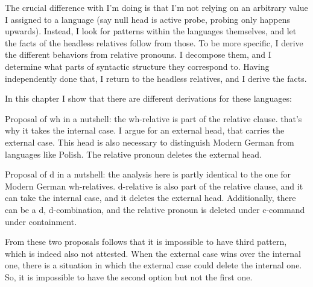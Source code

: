 The crucial difference with I'm doing is that I'm not relying on an arbitrary value I assigned to a language (say null head is active probe, probing only happens upwards). Instead, I look for patterns within the languages themselves, and let the facts of the headless relatives follow from those. To be more specific, I derive the different behaviors from relative pronouns. I decompose them, and I determine what parts of syntactic structure they correspond to. Having independently done that, I return to the headless relatives, and I derive the facts.

In this chapter I show that there are different derivations for these languages:



Proposal of wh in a nutshell: the wh-relative is part of the relative clause. that's why it takes the internal case. I argue for an external head, that carries the external case. This head is also necessary to distinguish Modern German from languages like Polish. The relative pronoun deletes the external head.

Proposal of d in a nutshell: the analysis here is partly identical to the one for Modern German wh-relatives. d-relative is also part of the relative clause, and it can take the internal case, and it deletes the external head. Additionally, there can be a d, d-combination, and the relative pronoun is deleted under c-command under containment.

From these two proposals follows that it is impossible to have third pattern, which is indeed also not attested. When the external case wins over the internal one, there is a situation in which the external case could delete the internal one. So, it is impossible to have the second option but not the first one.



